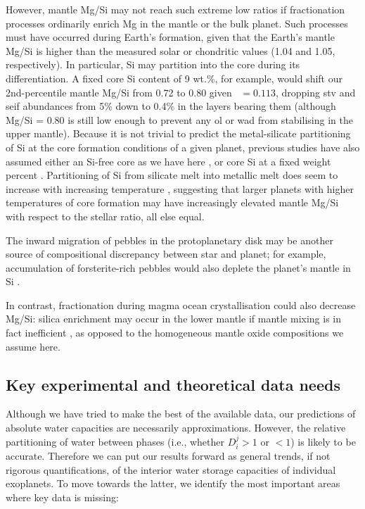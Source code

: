 However, mantle Mg/Si may not reach such extreme low ratios if fractionation processes ordinarily enrich Mg in the mantle or the bulk planet. Such processes must have occurred during Earth's formation, given that the Earth's mantle Mg/Si \citep[1.25;][]{mcdonough_composition_1995} is higher than the measured solar or chondritic values (1.04 and 1.05, respectively). In particular, Si may partition into the core during its differentiation. A fixed core Si content of 9 wt.\%, for example, would shift our 2nd-percentile mantle Mg/Si from 0.72 to 0.80 given \coreeff~$ =0.113$, dropping stv and seif abundances from 5\% down to 0.4\% in the layers bearing them (although Mg/Si = 0.80 is still low enough to prevent any ol or wad from stabilising in the upper mantle). Because it is not trivial to predict the metal-silicate partitioning of Si at the core formation conditions of a given planet, previous studies have also assumed either an Si-free core as we have here \citep[e.g.,][]{dorn_can_2015,dorn_generalized_2017, dorn_interior_2018, hinkel_star_2018, wang_enhanced_2019, unterborn_pressure_2019, spaargaren_influence_2020, otegi_impact_2020}, or core Si at a fixed weight percent \citep{unterborn_scaling_2016, spaargaren_plausible_2022}. Partitioning of Si from silicate melt into metallic melt does seem to increase with increasing temperature \citep{fischer_high_2015}, suggesting that larger planets with higher temperatures of core formation may have increasingly elevated mantle Mg/Si with respect to the stellar ratio, all else equal. 

The inward migration of pebbles in the protoplanetary disk may be another source of compositional discrepancy between star and planet; for example, accumulation of forsterite-rich pebbles would also deplete the planet's mantle in Si \citep{miyazaki_dynamic_2020}. 

In contrast, fractionation during magma ocean crystallisation could also decrease Mg/Si: silica enrichment may occur in the lower mantle if mantle mixing is in fact inefficient \citep{ballmer_persistence_2017}, as opposed to the homogeneous mantle oxide compositions we assume here.



\subsection{Key experimental and theoretical data needs}

Although we have tried to make the best of the available data, our predictions of absolute water capacities are necessarily approximations. However, the relative partitioning of water between phases (i.e., whether $D^j_i >1$ or $<1$) is likely to be accurate. Therefore we can put our results forward as general trends, if not rigorous quantifications, of the interior water storage capacities of individual exoplanets. To move towards the latter, we identify the most important areas where key data is missing:

